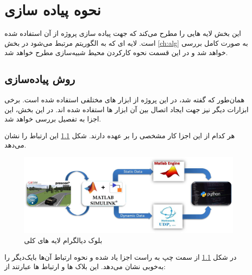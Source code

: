 \chapter{ نحوه پیاده سازی}\label{ch:fani}

این بخش لایه هایی را مطرح می‌کند که جهت پیاده سازی پروژه از آن استفاده شده است. لایه ای که به الگوریتم مرتبط می‌شود در بخش \ref{ch:alg} به صورت کامل بررسی خواهد شد و در این قسمت نحوه کارکردن محیط شبیه‌سازی مطرح خواهد شد.




\section{روش پیاده‌سازی}
همان‌طور که گفته شد، در این پروژه از ابزار های مختلفی استفاده شده است. برخی ابزارات دیگر نیز جهت ایجاد اتصال بین آن ابزار ها استفاده شده اند. در این بخش، این اجزا به تفصیل بررسی خواهد شد.

هر کدام از این اجزا کار مشخصی را بر عهده دارند.
شکل  
\ref{fig:block-diagram}
این ارتباط را نشان می‌دهد.

\begin{figure}[h!]
	\centering
	\includegraphics[width=1\linewidth]{Figures/block-diagram-white}
	\caption{بلوک دیالگرام لایه های کلی}
	\label{fig:block-diagram}
\end{figure}

در شکل 
\ref{fig:block-diagram}
از سمت چپ به راست اجزا یاد شده و نحوه ارتباط آن‌ها با‌یک‌دیگر را به‌خوبی نشان می‌دهد. این بلاک ها و ارتباط ها عبارتند از:

